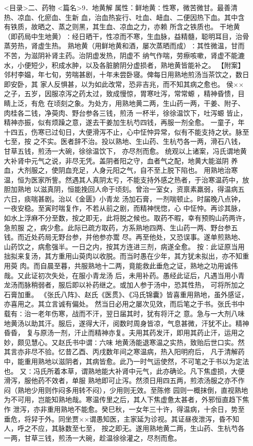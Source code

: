 \documentclass[a4paper,12pt,UTF8,twoside]{ctexbook}
\begin{document}
<目录>二、药物
<篇名>9．地黄解
属性：鲜地黄∶性寒，微苦微甘。最善清热、凉血、化瘀血、生新 
血，治血热妄行、吐血、衄血、二便因热下血。其中含有铁质，故晒之、蒸之则黑，其生血、凉血之力，亦赖 
所含之铁质也。 
干地黄（即药局中生地黄）∶经日晒干，性凉而不寒，生血脉，益精髓，聪明耳目，治骨蒸劳热，肾虚生热。 
熟地黄（用鲜地黄和酒，屡次蒸晒而成）∶其性微温，甘而不苦，为滋阴补肾主药。治阴虚发热，阴虚不 
纳气作喘，劳瘵咳嗽，肾虚不能漉水，小便短少，积成水肿，以及各脏腑阴分虚损者，熟地黄皆能补之。 
【附案】邻村李媪，年七旬，劳喘甚剧，十年未尝卧寝。俾每日用熟地煎汤当茶饮之，数日即安卧，其 
家人反惧甚，以为如此改常，恐非吉兆，而不知其病之愈也。 
侯××之子，五岁，因服凉泻之药太过，致成慢惊，胃寒吐泻，常常螈 ，精神昏愦，目睛上泛，有危 
在顷刻之象。为处方，用熟地黄二两，生山药一两，干姜、附子、肉桂各二钱，净萸肉、野台参各三钱，煎汤 
一杯半，徐徐温饮下，吐泻螈 皆止，精神亦振，似有烦躁之意，遂去干姜加生杭芍四钱，再服一剂全愈。 
一童子，年十四五，伤寒已过旬日，大便滑泻不止，心中怔忡异常，似有不能支持之状。脉至七至，按 
之不实。医者辞不治。投以熟地、生山药、生杭芍各一两，滑石八钱，甘草五钱，煎汤一大碗，徐徐温饮下， 
亦尽剂而愈。 
统观以上诸案，冯氏谓地黄大补肾中元气之说，非尽无凭。盖阴者阳之守，血者气之配，地黄大能滋阴 
养血，大剂服之，使阴血充足，人身元阳之气，自不至上脱下陷也。 
用熟地治寒温，恒为医家所訾。然遇其人真阴太亏，不能支持外感之热者，于治寒温药中，放胆加熟地 
以滋真阴，恒能挽回人命于顷刻。曾治一室女，资禀素羸弱，得温病五六日，痰喘甚剧。治以《金匮》小青龙 
汤加石膏，一剂喘顿止。时届晚八点钟，一夜安稳。至寅时喘复作，不若从前之剧，而精神恍惚，心 
中怔忡。再诊其脉，如水上浮麻不分至数，按之即无，此将脱之候也。取药不暇，幸有预购山药两许，急煎服 
之，病少愈。此际已疏方取药，方系熟地四两、生山药一两、野台参五钱。而近处药局无野台参，并他参亦鬻 
尽。再至他处，又恐误事。遂单煎熟地、山药饮之，病愈强半。一日之内，按其方连进三剂，病遂全愈。 
按∶此证原当用拙拟来复汤，其方重用山萸肉以收脱。而当时愚在少年，其方犹未拟出，亦不知重用萸 
肉。而自晨至暮，共服熟地十二两，竟能救此垂危之证，熟地之功用诚伟哉。又此证初次失处，在服小青龙汤 
后，未用补药。愚经此证后，凡遇当用小青龙汤而脉稍弱者，服后即以补药继之。或加人参于汤中，恐其性热， 
可将所加之石膏加重。 
《张氏八阵》、赵氏《医贯》、《冯氏锦囊》皆喜重用熟地，虽外感证，亦喜用之。其立言诚有偏处。 
然当日必用之屡次见效，而后笔之于书。张氏书中载有∶治一老年伤寒，战而不汗，翌日届其时，犹有将汗之 
意。急与一大剂八味地黄汤以助其汗。服后，遂得大汗，阅数时周身皆凉，气息甚微，汗犹不止。精神昏昏， 
复与原汤一剂，汗止而精神亦复。夫用其药发汗，即用其药止汗，运用之妙，颇见慧心。又赵氏书中谓∶六味 
地黄汤能退寒温之实热，致贻后世口实。然其言亦非尽不验。忆昔乙酉、丙戌数年间之寒温病，热入阳明府后， 
凡于清解药中，能重用熟地以滋阴者，其病皆愈。此乃一时气运使然，不可笔之于书以为定法也。 
又∶冯氏所着本草，谓熟地能大补肾中元气，此亦确论。凡下焦虚损，大便滑泻，服他药不效者，单服 
熟地即可止泻。然须日用四五两，煎浓汤服之亦不作闷（熟地少用则作闷多用转不闷），少用则无效。至陈修 
园则一概抹倒，直视熟地为不可用，岂能知熟地哉。寒温传里之后，其人下焦虚惫太甚者，外邪恒直趋下焦作 
泄泻，亦非重用熟地不能愈。癸巳秋，一女年三十许，得温病，十余日，势至 
垂危，将舁于外。同坐贾××谓愚知医，主家延为诊视。其证昼夜泄泻，昏不知人，呼之不应，其脉数至七至， 
按之即无。遂用熟地黄二两，生山药、生杭芍各一两，甘草三钱，煎汤一大碗，趁温徐徐灌之，尽剂而愈。 
\end{document}
